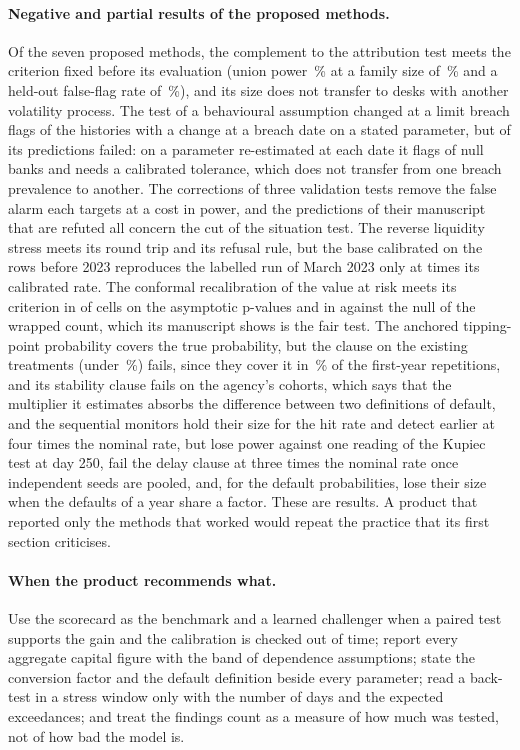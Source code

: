 \paragraph{Negative and partial results of the proposed methods.} Of the seven proposed methods, the complement to the attribution test meets the criterion fixed before its evaluation (union power \pxThirteenUnionPower{}\,\% at a family size of \pxThirteenSize{}\,\% and a held-out false-flag rate of \pxThirteenNullUnion{}\,\%), and its size does not transfer to desks with another volatility process. The test of a behavioural assumption changed at a limit breach flags \pxPpEightStatedAlt{} of the histories with a change at a breach date on a stated parameter, but \pxPpEightRefuted{} of its predictions failed: on a parameter re-estimated at each date it flags \pxPpEightFitNull{} of null banks and needs a calibrated tolerance, which does not transfer from one breach prevalence to another. The corrections of three validation tests remove the false alarm each targets at a cost in power, and the \pxPpTenHypRefuted{} predictions of their manuscript that are refuted all concern the cut of the situation test. The reverse liquidity stress meets its round trip and its refusal rule, but the base calibrated on the rows before 2023 reproduces the labelled run of March 2023 only at \pxPpElevenSvbMult{} times its calibrated rate. The conformal recalibration of the value at risk meets its criterion in \pxSixteenCellsHold{} of \pxSixteenCells{} cells on the asymptotic p-values and in \pxPpSixteenHoneGain{} against the null of the wrapped count, which its manuscript shows is the fair test. The anchored tipping-point probability covers the true probability, but the clause on the existing treatments (under \pxFourteenExistingTarget{}\,\%) fails, since they cover it in \pxFourteenIndustryNine{}\,\% of the first-year repetitions, and its stability clause fails on the agency's cohorts, which says that the multiplier it estimates absorbs the difference between two definitions of default, and the sequential monitors hold their size for the hit rate and detect earlier at four times the nominal rate, but lose power against one reading of the Kupiec test at day 250, fail the delay clause at three times the nominal rate once independent seeds are pooled, and, for the default probabilities, lose their size when the defaults of a year share a factor. These are results. A product that reported only the methods that worked would repeat the practice that its first section criticises.

\paragraph{When the product recommends what.} Use the scorecard as the benchmark and a learned challenger when a paired test supports the gain and the calibration is checked out of time; report every aggregate capital figure with the band of dependence assumptions; state the conversion factor and the default definition beside every parameter; read a back-test in a stress window only with the number of days and the expected exceedances; and treat the findings count as a measure of how much was tested, not of how bad the model is.
